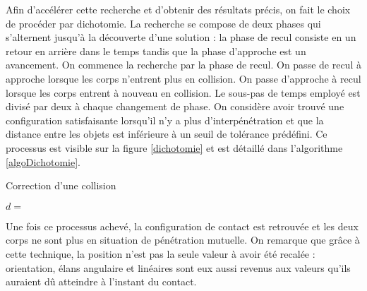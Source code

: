 Afin d'accélérer cette recherche et d'obtenir des résultats précis, on
fait le choix de procéder par dichotomie. La recherche se compose de
deux phases qui s'alternent jusqu'à la découverte d'une solution : la
phase de recul consiste en un retour en arrière dans le temps tandis
que la phase d'approche est un avancement. On commence la recherche
par la phase de recul. On passe de recul à approche lorsque les corps
n'entrent plus en collision. On passe d'approche à recul lorsque les
corps entrent à nouveau en collision. Le sous-pas de temps employé est
divisé par deux à chaque changement de phase. On considère avoir
trouvé une configuration satisfaisante lorsqu'il n'y a plus
d'interpénétration et que la distance entre les objets est inférieure
à un seuil de tolérance prédéfini. Ce processus est visible sur la
figure \ref{dichotomie} et est détaillé dans l'algorithme
\ref{algoDichotomie}.

\begin{algorithm}
  \caption{Correction d'une collision}
  \label{algoDichotomie}
  \dontprintsemicolon
  \BlankLine
  $d =$ \;
  \BlankLine
  \BlankLine
  \BlankLine
\end{algorithm}

Une fois ce processus achevé, la configuration de contact est
retrouvée et les deux corps ne sont plus en situation de pénétration
mutuelle. On remarque que grâce à cette technique, la position n'est
pas la seule valeur à avoir été recalée : orientation, élans angulaire
et linéaires sont eux aussi revenus aux valeurs qu'ils auraient dû
atteindre à l'instant du contact.

